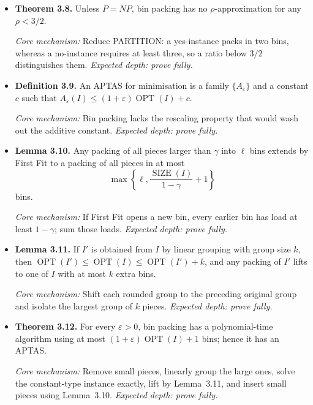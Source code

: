 \documentclass[11pt,a4paper]{article}
\newcommand{\OPT}{\operatorname{OPT}}
\newcommand{\1}{\mathbf 1}
\newcommand{\catalogue}[4]{%
  \item \textbf{#1.} #2\par
  {\footnotesize\emph{Core mechanism:} #3
  \emph{Expected depth: #4.}}}
\begin{document}
\begin{itemize}
\catalogue{Theorem 3.8}{Unless $P=NP$, bin packing has no
$\rho$-approximation for any $\rho<3/2$.}{Reduce PARTITION: a yes-instance
packs in two bins, whereas a no-instance requires at least three, so a ratio
below $3/2$ distinguishes them.}{prove fully}

\catalogue{Definition 3.9}{An APTAS for minimisation is a family
$\{A_\varepsilon\}$ and a constant $c$ such that
$A_\varepsilon(I)\leq(1+\varepsilon)\OPT(I)+c$.}{Bin packing lacks the
rescaling property that would wash out the additive constant.}{prove fully}

\catalogue{Lemma 3.10}{Any packing of all pieces larger than $\gamma$ into
$\ell$ bins extends by First Fit to a packing of all pieces in at most
\[
\max\!\left\{\ell,\frac{\operatorname{SIZE}(I)}{1-\gamma}+1\right\}
\]
bins.}{If First Fit opens a new bin, every earlier bin has load at least
$1-\gamma$; sum those loads.}{prove fully}

\catalogue{Lemma 3.11}{If $I'$ is obtained from $I$ by linear grouping with
group size $k$, then
$\OPT(I')\leq\OPT(I)\leq\OPT(I')+k$, and any packing of $I'$ lifts to one of
$I$ with at most $k$ extra bins.}{Shift each rounded group to the preceding
original group and isolate the largest group of $k$ pieces.}{prove fully}

\catalogue{Theorem 3.12}{For every $\varepsilon>0$, bin packing has a
polynomial-time algorithm using at most
$(1+\varepsilon)\OPT(I)+1$ bins; hence it has an APTAS.}{Remove small pieces,
linearly group the large ones, solve the constant-type instance exactly, lift
by Lemma~3.11, and insert small pieces using Lemma~3.10.}{prove fully}
\end{itemize}
\end{document}
